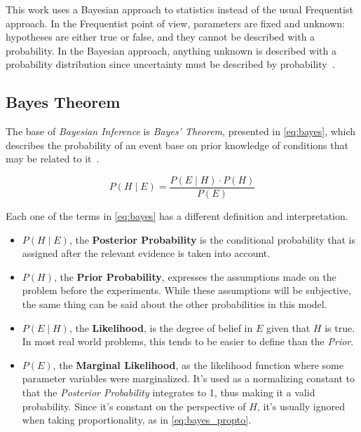 This work uses a Bayesian approach to statistics instead of the usual Frequentist approach. In the Frequentist point of view, parameters are fixed and unknown: hypotheses are either true or false, and they cannot be described with a probability. In the Bayesian approach, anything unknown is described with a probability distribution since uncertainty must be described by probability~\cite{mackay}.

\subsection{Bayes Theorem}

The base of \emph{Bayesian Inference} is \emph{Bayes' Theorem}, presented in \cref{eq:bayes}, which describes the probability of an event base on prior knowledge of conditions that may be related to it~\cite{gelman2003}.

\begin{equation}
\label{eq:bayes}
	P \left( H \mid E \right) = \frac{P \left( E \mid H \right) \cdot P \left( H \right)}{P \left( E \right)}
\end{equation}

Each one of the terms in \cref{eq:bayes} has a different definition and interpretation.

\begin{itemize}
	\item $P \left( H \mid E \right)$, the \textbf{Posterior Probability} is the conditional probability that is assigned after the relevant evidence is taken into account.
	\item $P \left( H \right)$, the \textbf{Prior Probability}, expresses the assumptions made on the problem before the experiments. While these assumptions will be subjective, the same thing can be said about the other probabilities in this model.
	\item $P \left( E \mid H \right)$, the \textbf{Likelihood}, is the degree of belief in $E$ given that $H$ is true. In most real world problems, this tends to be easier to define than the \emph{Prior}.
	\item $P \left( E \right)$, the \textbf{Marginal Likelihood}, as the likelihood function where some parameter variables were marginalized. It's used as a normalizing constant to that the \emph{Posterior Probability} integrates to 1, thus making it a valid probability. Since it's constant on the perspective of $H$, it's usually ignored when taking proportionality, as in \cref{eq:bayes_propto}.
\end{itemize}

